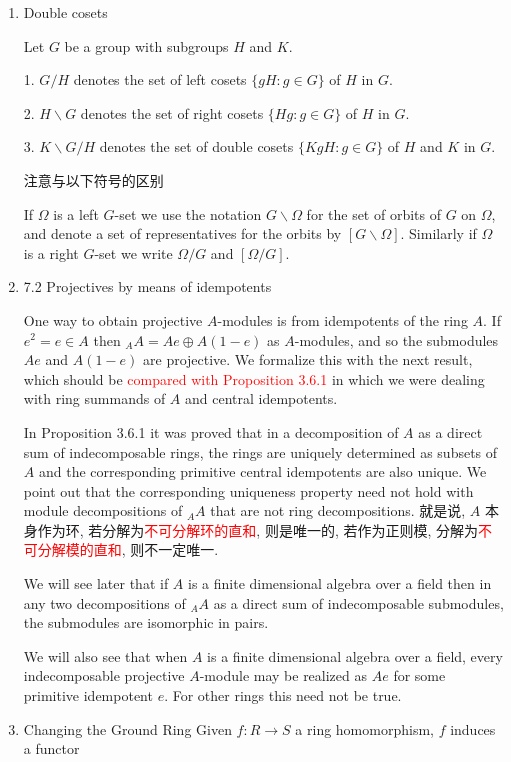 \documentclass{ctexart}
\begin{document}
\begin{enumerate}
\item Double cosets

Let $G$ be a group with subgroups $H$ and $K$.

1. $G/H$ denotes the set of left cosets $\{gH : g \in G\}$ of $H$ in $G$.

2. $H\backslash G$ denotes the set of right cosets $\{Hg : g \in G\}$ of $H$ in $G$.

3. $K\backslash G/H$ denotes the set of double cosets $\{KgH : g \in G\}$ of $H$ and $K$ in $G$.

注意与以下符号的区别

If $\Omega$ is a left $G$-set we use the notation $G\backslash \Omega$ for the set of orbits of $G$ on $\Omega$, and denote a set of representatives for the orbits by $[G\backslash \Omega]$. Similarly if $\Omega$ is a right $G$-set we write $\Omega /G$ and $[\Omega/G]$.

\item 7.2 Projectives by means of idempotents

One way to obtain projective $A$-modules is from idempotents of the ring $A$. If $e^2 = e \in A$ then ${}_AA = Ae \oplus A(1 - e)$ as $A$-modules, and so the submodules $Ae$ and $A(1 - e)$ are projective. We formalize this with the next result, which should be \textcolor{red}{compared with Proposition 3.6.1} in which we were dealing with ring summands of $A$ and central idempotents.

In Proposition 3.6.1 it was proved that in a decomposition of $A$ as a direct sum of indecomposable rings, the rings are uniquely determined as subsets of $A$ and the corresponding primitive central idempotents are also unique. We point out that the corresponding uniqueness property need not hold with module decompositions of ${}_AA$ that are not ring decompositions. 就是说, $A$ 本身作为环, 若分解为\textcolor{red}{不可分解环的直和}, 则是唯一的, 若作为正则模, 分解为\textcolor{red}{不可分解模的直和}, 则不一定唯一.

We will see later that if $A$ is a finite dimensional algebra over a field then in any two decompositions of ${}_AA$ as a direct sum of indecomposable submodules, the submodules are isomorphic in pairs.

We will also see that when $A$ is a finite dimensional algebra over a field, every indecomposable projective $A$-module may be realized as $Ae$ for some primitive idempotent $e$. For other rings this need not be true.

\item Changing the Ground Ring
Given $f : R \to S$ a ring homomorphism, $f$ induces a functor


\end{enumerate}
\end{document}
